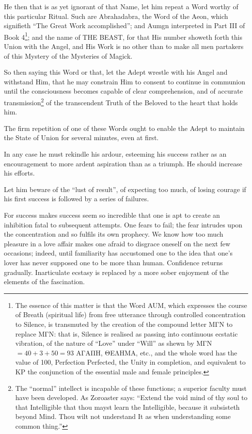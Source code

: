 He then that is as yet ignorant of that Name, let him repeat a Word worthy of this particular Ritual. Such are Abrahadabra, the Word of the Aeon, which signifieth \enquote{The Great Work accomplished}; and Aumgn interpreted in Part III of Book 4\footnote{The essence of this matter is that the Word AUM, which expresses the course of Breath (spiritual life) from free utterance through controlled concentration to Silence, is transmuted by the creation of the compound letter \textgreek{ΜΓΝ} to replace \textgreek{ΜΓΝ}: that is, Silence is realised as passing into continuous ecstatic vibration, of the nature of \enquote{Love} under \enquote{Will} as shewn by \textgreek{ΜΓΝ} $ = 40+3+50=93$ \textgreek{ΑΓΑΠΗ}, \textgreek{ΘΕΛΗΜΑ}, etc., and the whole word has the value of 100, Perfection Perfected, the Unity in completion, and equivalent to KP the conjunction of the essential male and female principles.}; and the name of THE BEAST, for that His number showeth forth this Union with the Angel, and His Work is no other than to make all men partakers of this Mystery of the Mysteries of Magick.

So then saying this Word or that, let the Adept wrestle with his Angel and withstand Him, that he may constrain Him to consent to continue in communion until the consciousness becomes capable of clear comprehension, and of accurate transmission\footnote{The \enquote{normal} intellect is incapable of these functions; a superior faculty must have been developed. As Zoroaster says: \enquote{Extend the void mind of thy soul to that Intelligible that thou mayst learn the Intelligible, because it subsisteth beyond Mind. Thou wilt not understand It as when understanding some common thing.}} of the transcendent Truth of the Beloved to the heart that holds him.

The firm repetition of one of these Words ought to enable the Adept to maintain the State of Union for several minutes, even at first.

In any case he must rekindle his ardour, esteeming his success rather as an encouragement to more ardent aspiration than as a triumph. He should increase his efforts.

Let him beware of the \enquote{lust of result}, of expecting too much, of losing courage if his first success is followed by a series of failures.

For success makes success seem so incredible that one is apt to create an inhibition fatal to subsequent attempts. One fears to fail; the fear intrudes upon the concentration and so fulfils its own prophecy. We know how too much pleasure in a love affair makes one afraid to disgrace oneself on the next few occasions; indeed, until familiarity has accustomed one to the idea that one’s lover has never supposed one to be more than human. Confidence returns gradually. Inarticulate ecstasy is replaced by a more sober enjoyment of the elements of the fascination.

